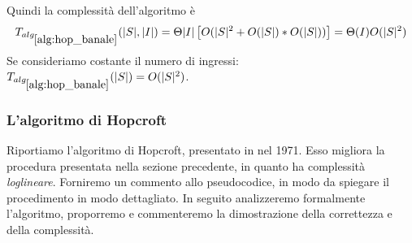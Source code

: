 Quindi la complessità dell'algoritmo è \begin{gather*}
    T_{alg_{\ref{alg:hop_banale}}}(|S|,|I|) = \Theta|I|\left[O(|S|^2 + O(|S|) * O(|S|))\right] = \Theta(I)O(|S|^2)
\end{gather*}
Se consideriamo costante il numero di ingressi: $T_{alg_{\ref{alg:hop_banale}}}(|S|) = O(|S|^2)$.

\subsubsection{L'algoritmo di Hopcroft}
Riportiamo l'algoritmo di Hopcroft, presentato in \cite{hopcroft} nel 1971. Esso migliora la procedura presentata nella sezione precedente, in quanto ha complessità \emph{loglineare}. Forniremo un commento allo pseudocodice, in modo da spiegare il procedimento in modo dettagliato. In seguito analizzeremo formalmente l'algoritmo, proporremo e commenteremo la dimostrazione della correttezza e della complessità.\\

